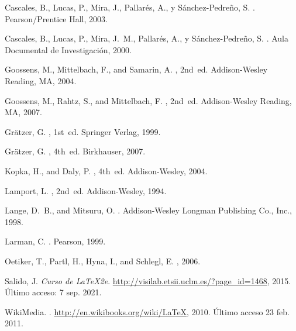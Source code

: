 \begin{thebibliography}{10}

{\sc Cascales, B., Lucas, P., Mira, J., Pallarés, A., y {Sánchez-Pedreño},
  S.}
.
\newblock Pearson/Prentice Hall, 2003.

{\sc Cascales, B., Lucas, P., Mira, J.~M., Pallarés, A., y
  Sánchez-Pedreño, S.}
.
\newblock Aula Documental de Investigación, 2000.

{\sc Goossens, M., Mittelbach, F., and Samarin, A.}
, 2nd~ed.
\newblock Addison-Wesley Reading, MA, 2004.

{\sc Goossens, M., Rahtz, S., and Mittelbach, F.}
, 2nd~ed.
\newblock Addison-Wesley Reading, MA, 2007.

{\sc Grätzer, G.}
, 1st~ed.
\newblock Springer Verlag, 1999.

{\sc Grätzer, G.}
, 4th~ed.
\newblock Birkhauser, 2007.

{\sc Kopka, H., and Daly, P.}
, 4th~ed.
\newblock Addison-Wesley, 2004.

{\sc Lamport, L.}
, 2nd~ed.
\newblock Addison-Wesley, 1994.

{\sc Lange, D.~B., and Mitsuru, O.}
.
\newblock Addison-Wesley Longman Publishing Co., Inc., 1998.

{\sc Larman, C.}
.
\newblock Pearson, 1999.

{\sc Oetiker, T., Partl, H., Hyna, I., and Schlegl, E.}
, 2006.

{\sc Salido, J.}
\newblock \emph{Curso de {\LaTeX2e{}}}.
 \url{http://visilab.etsii.uclm.es/?page_id=1468}, 2015.
\newblock Último acceso: 7 sep. 2021.

{\sc WikiMedia}.
.
 \url{http://en.wikibooks.org/wiki/LaTeX}, 2010.
\newblock Último acceso 23 feb. 2011.

\end{thebibliography}
